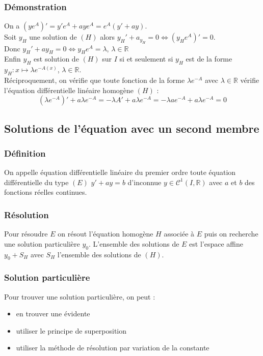 \documentclass[a4paper,10pt]{book} %
\newcommand{\R}{\mathbb{R}}
\newcommand{\edl}{équation différentielle linéaire }
\newcommand{\edlh}{\edl homogène }
\begin{document}
\subsubsection{Démonstration}
On a $(ye^A)'=y'e^A+aye^A=e^A(y'+ay)$.\\
Soit $y_H$ une solution de $(H)$ alors $y_H'+a_{y_H}=0 \Leftrightarrow (y_He^A)'=0$.\\
Donc $y_H'+ay_H=0 \Leftrightarrow y_He^A=\lambda$, $\lambda\in \R$\\

Enfin $y_H$ est solution de $(H)$ sur $I$ si et seulement si $y_H$ est de la forme $y_H:x\mapsto \lambda e^{-A(x)}$, $\lambda\in \R$.\\

Réciproquement, on vérifie que toute fonction de la forme $\lambda e^{-A}$ avec $\lambda \in \R$ vérifie l'\edlh $(H)$ :\\
$$(\lambda e^{-A})'+a\lambda e^{-A}=-\lambda A'+a\lambda e^{-A}=-\lambda ae^{-A}+a\lambda e^{-A}=0$$

\subsection{Solutions de l'équation avec un second membre}
\subsubsection{Définition}
On appelle \edl du premier ordre toute équation différentielle du type $(E)$ $y'+ay=b$ d'inconnue $y\in \mathcal{C}^1(I,\R)$ avec $a$ et $b$ des fonctions réelles continues.

\subsubsection{Résolution}
Pour résoudre $E$ on résout l'équation homogène $H$ associée à $E$ puis on recherche une solution particulière $y_0$. L'ensemble des solutions de $E$ est l'espace affine $y_0+S_H$ avec $S_H$ l'ensemble des solutions de $(H)$.

\subsubsection{Solution particulière}
Pour trouver une solution particulière, on peut :\begin{itemize}
\item en trouver une évidente
\item utiliser le principe de superposition
\item utiliser la méthode de résolution par variation de la constante\\\end{itemize}
\end{document}
